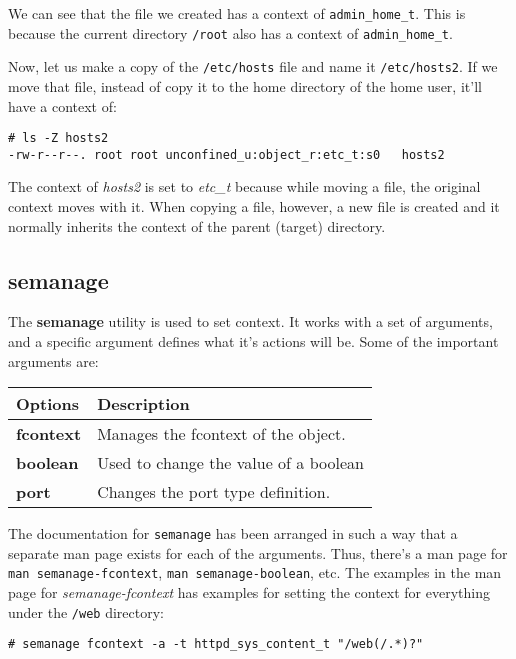 \noindent
We can see that the file we created has a context of \verb|admin_home_t|. This is because the current directory \verb|/root| also has a context of \verb|admin_home_t|. 

Now, let us make a copy of the \verb|/etc/hosts| file and name it \verb|/etc/hosts2|. If we move that file, instead of copy it to the home directory of the home user, it'll have a context of:

\vspace{-15pt}
\begin{verbatim}
# ls -Z hosts2 
-rw-r--r--. root root unconfined_u:object_r:etc_t:s0   hosts2
\end{verbatim}
\vspace{-10pt}

\noindent
The context of \textit{hosts2} is set to \textit{etc\_t} because while moving a file, the original context moves with it. When copying a file, however, a new file is created and it normally inherits the context of the parent (target) directory. 

\subsection{semanage}
The \textbf{semanage} utility is used to set context. It works with a set of arguments, and a specific argument defines what it's actions will be. Some of the important arguments are:

\noindent
\begin{tabular}{lM{0.84}}
	\toprule
	\textbf{Options} &\textbf{Description} \\
	\midrule
	\textbf{fcontext}	&Manages the fcontext of the object.\\
	\textbf{boolean}	&Used to change the value of a boolean\\
	\textbf{port}	&Changes the port type definition.\\
	\bottomrule
\end{tabular}

\noindent
The documentation for \verb|semanage| has been arranged in such a way that a separate man page exists for each of the arguments. Thus, there's a man page for \verb|man semanage-fcontext|, \verb|man semanage-boolean|, etc. The examples in the man page for \textit{semanage-fcontext} has examples for setting the context for everything under the \verb|/web| directory:

\vspace{-15pt}
\begin{verbatim}
# semanage fcontext -a -t httpd_sys_content_t "/web(/.*)?"
\end{verbatim}
\vspace{-10pt}

